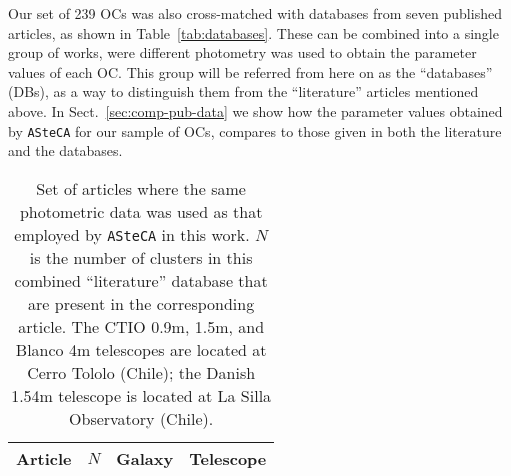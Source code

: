 \documentclass[a4paper,fleqn,usenatbib]{mnras}
\begin{document}
Our set of 239 OCs was also cross-matched with databases from seven
published articles, as shown in Table~\ref{tab:databases}.
These can be combined into a single group of works, were different
photometry was used to obtain the parameter values of each OC. This group will
be referred from here on as the ``databases'' (DBs), as a way to distinguish
them from the ``literature'' articles mentioned above.
%
In Sect.~\ref{sec:comp-pub-data} we show how the parameter values obtained
by \texttt{ASteCA} for our sample of OCs, compares to those given in both the
literature and the databases.

\begin{table} 
\centering
 \caption{Set of articles where the same photometric data was used as that
 employed by \texttt{ASteCA} in this work.
 $N$ is the number of clusters in this combined ``literature'' database that are
 present in the  corresponding article. The CTIO 0.9m, 1.5m, and Blanco 4m
 telescopes are  located at Cerro Tololo (Chile); the Danish 1.54m telescope is
 located at La Silla Observatory (Chile).}
\label{tab:literature}
 \begin{tabular}{l c c c}
\hline
Article & $N$ & Galaxy & Telescope \\
\hline

\end{tabular}
\end{table}
\end{document}
